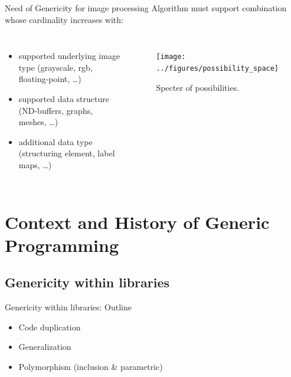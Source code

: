 \documentclass[12pt,aspectratio=169]{beamer}
\begin{document}
\begin{frame}[fragile]{Need of Genericity for image processing}
  Algorithm must support combination whose cardinality increases with:

  \begin{columns}[T,onlytextwidth]
    \begin{itemize}
      \item supported underlying image type (grayscale, rgb, floating-point, \ldots)
      \item supported data structure (ND-buffers, graphs, meshes, \ldots)
      \item additional data type (structuring element, label maps, \ldots)
    \end{itemize}

    \begin{figure}[htbp]
      \centering
      \texttt{[image: ../figures/possibility\_space]}
      \caption{Specter of possibilities.}
      \label{fig:int.possibility_space}
    \end{figure}
  \end{columns}
\end{frame}

%
%
%

\section[Context and History of Generic Programming]{Context and History of Generic Programming}

\subsection[Context and History of Generic Programming]{Genericity within libraries}

\begin{frame}[fragile]{Genericity within libraries: Outline}
  \begin{itemize}
    \item Code duplication
    \item Generalization
    \item Polymorphism (inclusion \& parametric)
  \end{itemize}
\end{frame}
\end{document}
